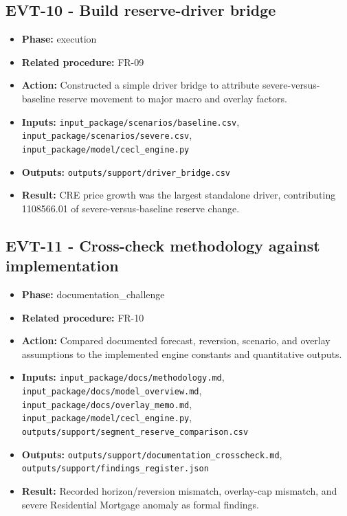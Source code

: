 \documentclass[11pt]{article}
\begin{document}
\subsection*{EVT-10 - Build reserve-driver bridge}
\begin{itemize}
\item \textbf{Phase:} execution
\item \textbf{Related procedure:} FR-09
\item \textbf{Action:} Constructed a simple driver bridge to attribute severe-versus-baseline reserve movement to major macro and overlay factors.
\item \textbf{Inputs:} \texttt{input\_package/scenarios/baseline.csv}, \texttt{input\_package/scenarios/severe.csv}, \texttt{input\_package/model/cecl\_engine.py}
\item \textbf{Outputs:} \texttt{outputs/support/driver\_bridge.csv}
\item \textbf{Result:} CRE price growth was the largest standalone driver, contributing 1108566.01 of severe-versus-baseline reserve change.
\end{itemize}
\subsection*{EVT-11 - Cross-check methodology against implementation}
\begin{itemize}
\item \textbf{Phase:} documentation\_challenge
\item \textbf{Related procedure:} FR-10
\item \textbf{Action:} Compared documented forecast, reversion, scenario, and overlay assumptions to the implemented engine constants and quantitative outputs.
\item \textbf{Inputs:} \texttt{input\_package/docs/methodology.md}, \texttt{input\_package/docs/model\_overview.md}, \texttt{input\_package/docs/overlay\_memo.md}, \texttt{input\_package/model/cecl\_engine.py}, \texttt{outputs/support/segment\_reserve\_comparison.csv}
\item \textbf{Outputs:} \texttt{outputs/support/documentation\_crosscheck.md}, \texttt{outputs/support/findings\_register.json}
\item \textbf{Result:} Recorded horizon/reversion mismatch, overlay-cap mismatch, and severe Residential Mortgage anomaly as formal findings.
\end{itemize}
\end{document}
